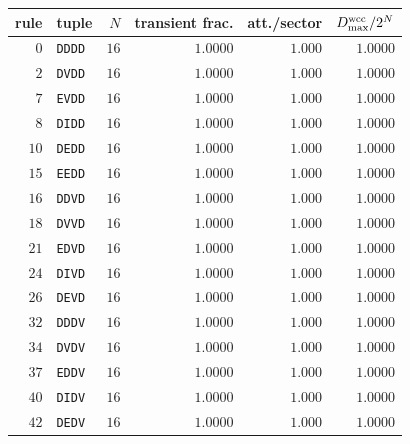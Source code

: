 \begin{tabular}{rlrrrr}
\hline
rule & tuple & $N$ & transient frac. & att./sector & $D_{\max}^{\rm wcc}/2^N$ \\
\hline
$0$ & \texttt{DDDD} & $16$ & $1.0000$ & $1.000$ & $1.0000$ \\
$2$ & \texttt{DVDD} & $16$ & $1.0000$ & $1.000$ & $1.0000$ \\
$7$ & \texttt{EVDD} & $16$ & $1.0000$ & $1.000$ & $1.0000$ \\
$8$ & \texttt{DIDD} & $16$ & $1.0000$ & $1.000$ & $1.0000$ \\
$10$ & \texttt{DEDD} & $16$ & $1.0000$ & $1.000$ & $1.0000$ \\
$15$ & \texttt{EEDD} & $16$ & $1.0000$ & $1.000$ & $1.0000$ \\
$16$ & \texttt{DDVD} & $16$ & $1.0000$ & $1.000$ & $1.0000$ \\
$18$ & \texttt{DVVD} & $16$ & $1.0000$ & $1.000$ & $1.0000$ \\
$21$ & \texttt{EDVD} & $16$ & $1.0000$ & $1.000$ & $1.0000$ \\
$24$ & \texttt{DIVD} & $16$ & $1.0000$ & $1.000$ & $1.0000$ \\
$26$ & \texttt{DEVD} & $16$ & $1.0000$ & $1.000$ & $1.0000$ \\
$32$ & \texttt{DDDV} & $16$ & $1.0000$ & $1.000$ & $1.0000$ \\
$34$ & \texttt{DVDV} & $16$ & $1.0000$ & $1.000$ & $1.0000$ \\
$37$ & \texttt{EDDV} & $16$ & $1.0000$ & $1.000$ & $1.0000$ \\
$40$ & \texttt{DIDV} & $16$ & $1.0000$ & $1.000$ & $1.0000$ \\
$42$ & \texttt{DEDV} & $16$ & $1.0000$ & $1.000$ & $1.0000$ \\
\hline
\end{tabular}
